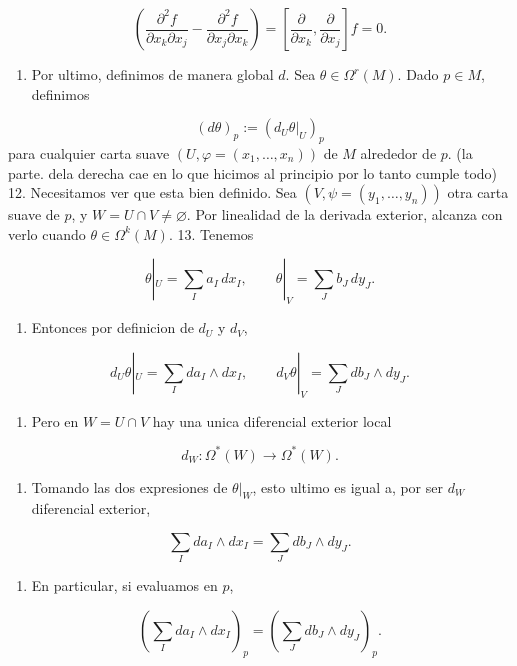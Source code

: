 \begin{bookproof}{}
\[
\left(\frac{\partial^2 f}{\partial x_k\partial x_j}-\frac{\partial^2 f}{\partial x_j\partial x_k}\right)=\left[\frac{\partial }{\partial x_k},\frac{\partial}{\partial x_j}\right]f=0.
\]
\begin{enumerate}[start=11]
\item Por ultimo, definimos de manera global $d$. Sea $\theta\in\Omega^r(M)$. Dado $p\in M$, definimos
\end{enumerate}
\[
(d\theta)_p:=(d_U\theta|_U)_p
\]
para cualquier carta suave $(U,\varphi=(x_1,\ldots,x_n))$ de $M$ alrededor de $p$. (la parte. dela derecha cae en lo que hicimos al principio por lo tanto cumple todo) 12. Necesitamos ver que esta bien definido. Sea $(V,\psi=(y_1,\ldots,y_n))$ otra carta suave de $p$, y $W=U\cap V\ne\varnothing$. Por linealidad de la derivada exterior, alcanza con verlo cuando $\theta\in\Omega^k(M)$. 13. Tenemos

\[
\theta|_U=\sum_Ia_I\,dx_I,\qquad \theta|_V=\sum_Jb_J\,dy_J.
\]
\begin{enumerate}[start=14]
\item Entonces por definicion de $d_U$ y $d_V$,
\end{enumerate}
\[
d_U\theta|_U=\sum_Ida_I\wedge dx_I,\qquad d_V\theta|_V=\sum_Jdb_J\wedge dy_J.
\]
\begin{enumerate}[start=15]
\item Pero en $W=U\cap V$ hay una unica diferencial exterior local
\end{enumerate}
\[
d_W:\Omega^*(W)\to\Omega^{*}(W).
\]
\begin{enumerate}[start=16]
\item Tomando las dos expresiones de $\theta|_W$, esto ultimo es igual a, por ser $d_W$ diferencial exterior,
\end{enumerate}
\[
\sum_Ida_I\wedge dx_I=\sum_Jdb_J\wedge dy_J.
\]
\begin{enumerate}[start=17]
\item En particular, si evaluamos en $p$,
\end{enumerate}
\[
(\sum_Ida_I\wedge dx_I)_p=(\sum_Jdb_J\wedge dy_J)_p.
\]
\bookqed
\end{bookproof}
